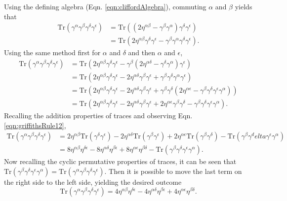 Using the defining algebra (Eqn. \ref{eqn:cliffordAlgebra}), commuting $\alpha$ and $\beta$ yields
that
\begin{align*}
\text{Tr}(\gamma^\alpha\gamma^\beta\gamma^\delta\gamma^\epsilon)&=\text{Tr}((2\eta^{\alpha\beta}-\gamma^\beta\gamma^\alpha)\gamma^\delta\gamma^\epsilon)\\
&=\text{Tr}(2\eta^{\alpha\beta}\gamma^\delta\gamma^\epsilon-\gamma^\beta\gamma^\alpha\gamma^\delta\gamma^\epsilon).
\end{align*}
Using the same method first for $\alpha$ and $\delta$ and then $\alpha$ and $\epsilon$,
\begin{align*}
\text{Tr}(\gamma^\alpha\gamma^\beta\gamma^\delta\gamma^\epsilon)
&=\text{Tr}(2\eta^{\alpha\beta}\gamma^\delta\gamma^\epsilon-\gamma^\beta(2\eta^{\alpha\delta}-\gamma^\delta\gamma^\alpha)\gamma^\epsilon)\\
&=\text{Tr}(2\eta^{\alpha\beta}\gamma^\delta\gamma^\epsilon-2\eta^{\alpha\delta}\gamma^\beta\gamma^\epsilon+\gamma^\beta\gamma^\delta\gamma^\alpha\gamma^\epsilon)\\
&=\text{Tr}(2\eta^{\alpha\beta}\gamma^\delta\gamma^\epsilon-2\eta^{\alpha\delta}\gamma^\beta\gamma^\epsilon+\gamma^\beta\gamma^\delta(2\eta^{\alpha\epsilon}-\gamma^\beta\gamma^\delta\gamma^\epsilon\gamma^\alpha))\\
&=\text{Tr}(2\eta^{\alpha\beta}\gamma^\delta\gamma^\epsilon-2\eta^{\alpha\delta}\gamma^\beta\gamma^\epsilon+2\eta^{\alpha\epsilon}\gamma^\beta\gamma^\delta-\gamma^\beta\gamma^\delta\gamma^\epsilon\gamma^\alpha).
\end{align*}
Recalling the addition properties of traces and observing Eqn. \ref{eqn:griffithsRule12},
\begin{align*}
\text{Tr}(\gamma^\alpha\gamma^\beta\gamma^\delta\gamma^\epsilon)
&=2\eta^{\alpha\beta}\text{Tr}(\gamma^\delta\gamma^\epsilon)-2\eta^{\alpha\delta}\text{Tr}(\gamma^\beta\gamma^\epsilon)+2\eta^{\alpha\epsilon}\text{Tr}(\gamma^\beta\gamma^\delta)-\text{Tr}(\gamma^\beta\gamma^delta\gamma^\epsilon\gamma^\alpha)\\
&=8\eta^{\alpha\beta}\eta^{\delta\epsilon}-8\eta^{\alpha\delta}\eta^{\beta\epsilon}+8\eta^{\alpha\epsilon}\eta^{\beta\delta}-\text{Tr}(\gamma^\beta\gamma^\delta\gamma^\epsilon\gamma^\alpha).
\end{align*}
Now recalling the cyclic permutative properties of traces, it can be seen that $\text{Tr}(\gamma^\beta\gamma^\delta\gamma^\epsilon\gamma^\alpha)=\text{Tr}(\gamma^\alpha\gamma^\beta\gamma^\delta\gamma^\epsilon)$. Then it is possible to move the last term on the right side to the left side, yielding the desired outcome
\begin{equation}\label{eqn:griffithsRule13}
\text{Tr}(\gamma^\alpha\gamma^\beta\gamma^\delta\gamma^\epsilon)=4\eta^{\alpha\beta}\eta^{\delta\epsilon}-4\eta^{\alpha\delta}\eta^{\beta\epsilon}+4\eta^{\alpha\epsilon}\eta^{\beta\delta}.
\end{equation}
 \label{apx:code}

